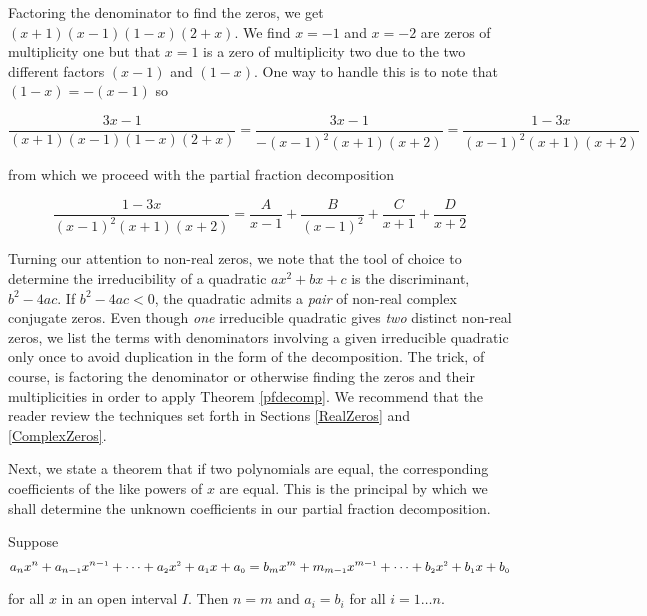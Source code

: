 \documentclass{ximera}
\begin{document}
Factoring the denominator to find the zeros, we get $(x+1)(x-1)(1-x)(2+x)$.  We find $x = -1$ and $x=-2$ are zeros of multiplicity one but that $x=1$ is a zero of multiplicity two due to the two different factors $(x-1)$ and $(1-x)$.  One way to handle this is to note that $(1-x) = -(x-1)$ so 

\[\dfrac{3x-1}{(x+1)(x-1)(1-x)(2+x)} = \dfrac{3x-1}{-(x-1)^2(x+1)(x+2)} = \dfrac{1-3x}{(x-1)^2(x+1)(x+2)}\]

from which we proceed with the partial fraction decomposition

\[\dfrac{1-3x}{(x-1)^2(x+1)(x+2)} = \dfrac{A}{x-1} + \dfrac{B}{(x-1)^2} + \dfrac{C}{x+1} + \dfrac{D}{x+2}\]

Turning our attention to non-real zeros, we note that the tool of choice to determine the irreducibility of a quadratic  $ax^2+bx+c$ is the discriminant, $b^2-4ac$.  If $b^2 - 4ac < 0$, the quadratic admits a \textit{pair} of non-real complex conjugate zeros.  Even though \textit{one} irreducible quadratic gives \textit{two} distinct non-real zeros, we list the terms with denominators involving a given irreducible quadratic only once to avoid duplication in the form of the decomposition.  The trick, of course, is factoring the denominator or otherwise finding the zeros and their multiplicities in order to apply Theorem \ref{pfdecomp}.  We recommend that the reader review the techniques set forth in Sections \ref{RealZeros} and \ref{ComplexZeros}. 

Next, we state a theorem that if two polynomials are equal, the corresponding coefficients of the like powers of $x$ are equal.  This is the principal by which we shall determine the unknown coefficients in our partial fraction decomposition.

\smallskip

\colorbox{ResultColor}{\bbm

\begin{theorem}  \label{polyequality} Suppose \[a_{n} x^{n} + a_{n-\mbox{\tiny$1$}} x^{n-\mbox{\tiny$1$}} + \cdots + a_{\mbox{\tiny $2$}} x^{\mbox{\tiny $2$}} + a_{\mbox{\tiny $1$}} x + a_{\mbox{\tiny $0$}} = b_{m} x^{m} + m_{m-\mbox{\tiny$1$}} x^{m-\mbox{\tiny$1$}} + \cdots + b_{\mbox{\tiny $2$}} x^{\mbox{\tiny $2$}} + b_{\mbox{\tiny $1$}} x + b_{\mbox{\tiny $0$}}\]

for all $x$ in an open interval $I$.  Then $n=m$ and $a_{i} = b_{i}$ for all $i = 1 \ldots n$.


\end{theorem}

\ebm}
\end{document}
